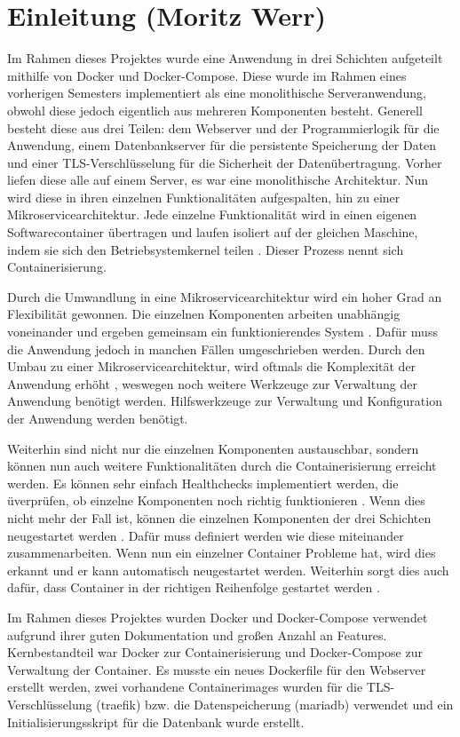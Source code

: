 \chapter{Einleitung (Moritz Werr)}

\nocite{*}

Im Rahmen dieses Projektes wurde eine Anwendung in drei Schichten aufgeteilt mithilfe von Docker und Docker-Compose. Diese wurde im Rahmen eines vorherigen Semesters implementiert als eine monolithische Serveranwendung, obwohl diese jedoch eigentlich aus mehreren Komponenten besteht. Generell besteht diese aus drei Teilen: dem Webserver und der Programmierlogik für die Anwendung, einem Datenbankserver für die persistente Speicherung der Daten und einer TLS-Verschlüsselung für die Sicherheit der Datenübertragung. Vorher liefen diese alle auf einem Server, es war eine monolithische Architektur. Nun wird diese in ihren einzelnen Funktionalitäten aufgespalten, hin zu einer Mikroservicearchitektur. Jede einzelne Funktionalität wird in einen eigenen Softwarecontainer übertragen und laufen isoliert auf der gleichen Maschine, indem sie sich den Betriebsystemkernel teilen \cite[Vgl. S. 152444]{watada_emerging_2019}. Dieser Prozess nennt sich Containerisierung.

Durch die Umwandlung in eine Mikroservicearchitektur wird ein hoher Grad an Flexibilität gewonnen. Die einzelnen Komponenten arbeiten unabhängig voneinander und ergeben gemeinsam ein funktionierendes System \cite[Vgl. S.1f]{fowler_microservices_2015}. Dafür muss die Anwendung jedoch in manchen Fällen  umgeschrieben werden. Durch den Umbau zu einer Mikroservicearchitektur, wird oftmals die Komplexität der Anwendung erhöht \cite[Vgl. S.10]{su_modular_2024}, weswegen noch weitere Werkzeuge zur Verwaltung der Anwendung benötigt werden. Hilfswerkzeuge zur Verwaltung und Konfiguration der Anwendung werden benötigt. 

Weiterhin sind nicht nur die einzelnen Komponenten austauschbar, sondern können nun auch weitere Funktionalitäten durch die Containerisierung erreicht werden. Es können sehr einfach Healthchecks implementiert werden, die üverprüfen, ob einzelne Komponenten noch richtig funktionieren \cite{noauthor_services_0100}. Wenn dies nicht mehr der Fall ist, können die einzelnen Komponenten der drei Schichten neugestartet werden \cite{noauthor_services_0100}. Dafür muss definiert werden wie diese miteinander zusammenarbeiten. Wenn nun ein einzelner Container Probleme hat, wird dies erkannt und er kann automatisch neugestartet werden. Weiterhin sorgt dies auch dafür, dass Container in der richtigen Reihenfolge gestartet werden \cite{noauthor_services_0100}.

Im Rahmen dieses Projektes wurden Docker und Docker-Compose verwendet aufgrund ihrer guten Dokumentation und großen Anzahl an Features. Kernbestandteil war Docker zur Containerisierung und Docker-Compose zur Verwaltung der Container. Es musste ein neues Dockerfile für den Webserver erstellt werden, zwei vorhandene Containerimages wurden für die TLS-Verschlüsselung (traefik) bzw. die Datenspeicherung (mariadb) verwendet und ein Initialisierungsskript für die Datenbank wurde erstellt.